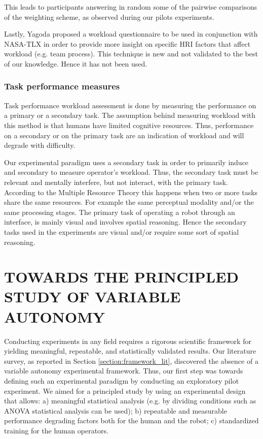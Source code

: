 \documentclass[a4paper,12pt,oneside,openright]{bhamthesis}
\begin{document}
This leads to participants answering in random some of the pairwise comparisons of the weighting scheme, as observed during our pilots experiments.

Lastly, Yagoda \citep{Yagoda2010} proposed a workload questionnaire to be used in conjunction with NASA-TLX in order to provide more insight on specific HRI factors that affect workload (e.g. team process). This technique is new and not validated to the best of our knowledge. Hence it has not been used. 

\subsection{Task performance measures}
Task performance workload assessment is done by measuring the performance on a primary or a secondary task. The assumption behind measuring workload with this method is that humans have limited cognitive resources. Thus, performance on a secondary or on the primary task are an indication of workload and will degrade with difficulty.

Our experimental paradigm uses a secondary task in order to primarily induce and secondary to measure operator's workload. Thus, the secondary task must be relevant and mentally interfere, but not interact, with the primary task. According to the Multiple Resource Theory \citep{Wickens2008,Wickens2002} this happens when two or more tasks share the same resources. For example the same perceptual modality and/or the same processing stages. The primary task of operating a robot through an interface, is mainly visual and involves spatial reasoning. Hence the secondary tasks used in the experiments are visual and/or require some sort of spatial reasoning. 


\chapter{TOWARDS THE PRINCIPLED STUDY OF VARIABLE AUTONOMY}\label{chapter3:towards}

Conducting experiments in any field requires a rigorous scientific framework for yielding meaningful, repeatable, and statistically validated results. Our literature survey, as reported in Section \ref{section:framework_lit}, discovered the absence of a variable autonomy experimental framework. Thus, our first step was towards defining such an experimental paradigm by conducting an exploratory pilot experiment. We aimed for a principled study by using an experimental design that allows: a) meaningful statistical analysis (e.g. by dividing conditions such as ANOVA statistical analysis can be used); b) repeatable and measurable performance degrading factors both for the human and the robot; c) standardized training for the human operators.
\end{document}
